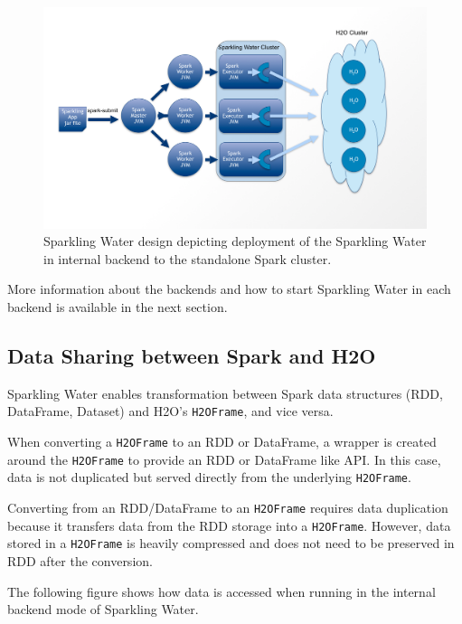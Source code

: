 \documentclass{standalone}
\begin{document}
    \begin{figure}[h!]
        \centering
        \includegraphics[scale=0.4]{../images/Topology-external.png}
        \caption{Sparkling Water design depicting deployment of the Sparkling Water in internal backend to the standalone Spark cluster.}
    \end{figure}

    More information about the backends and how to start Sparkling Water in each backend is available in the next section.

    \subsection{Data Sharing between Spark and H2O}

    Sparkling Water enables transformation between Spark data structures (RDD, DataFrame, Dataset) and H2O's
    \texttt{H2OFrame}, and vice versa.

    When converting a \texttt{H2OFrame} to an RDD or DataFrame, a wrapper is created around the \texttt{H2OFrame} to provide
    an RDD or DataFrame like API. In this case, data is not duplicated but served directly from the underlying \texttt{H2OFrame}.

    Converting from an RDD/DataFrame to an \texttt{H2OFrame} requires data duplication because it transfers
    data from the RDD storage into a \texttt{H2OFrame}. However, data stored in a \texttt{H2OFrame} is heavily compressed
    and does not need to be preserved in RDD after the conversion.

    The following figure shows how data is accessed when running in the internal backend mode of Sparkling Water.
\end{document}
